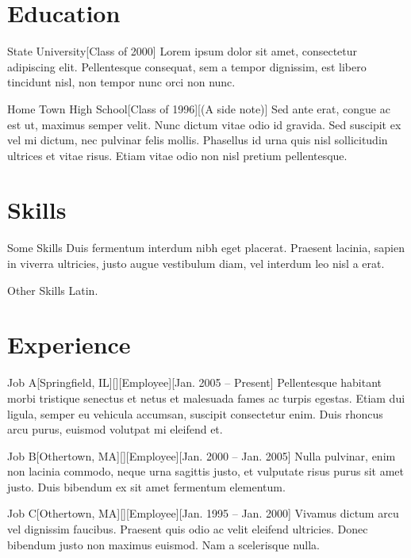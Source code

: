 \documentclass{kres}
\author{John Q. Public}
\begin{document}
\makename
\makecontact
\section{Education}
\begin{entry}{State University}[Class of 2000]
Lorem ipsum dolor sit amet, consectetur adipiscing elit. Pellentesque consequat, sem a tempor dignissim, est libero tincidunt nisl, non tempor nunc orci non nunc.
\end{entry}
\begin{entry}{Home Town High School}[Class of 1996][(A side note)]
Sed ante erat, congue ac est ut, maximus semper velit. Nunc dictum vitae odio id gravida. Sed suscipit ex vel mi dictum, nec pulvinar felis mollis. Phasellus id urna quis nisl sollicitudin ultrices et vitae risus. Etiam vitae odio non nisl pretium pellentesque.
\end{entry}
\section{Skills}
\begin{inlineentry}{Some Skills}
Duis fermentum interdum nibh eget placerat. Praesent lacinia, sapien in viverra ultricies, justo augue vestibulum diam, vel interdum leo nisl a erat.
\end{inlineentry}
\begin{inlineentry}{Other Skills}
Latin.
\end{inlineentry}
\section{Experience}
\begin{entry}{Job A}[Springfield, IL][][Employee][Jan. 2005 -- Present]
Pellentesque habitant morbi tristique senectus et netus et malesuada fames ac turpis egestas. Etiam dui ligula, semper eu vehicula accumsan, suscipit consectetur enim. Duis rhoncus arcu purus, euismod volutpat mi eleifend et.
\end{entry}
\begin{entry}{Job B}[Othertown, MA][][Employee][Jan. 2000 -- Jan. 2005]
Nulla pulvinar, enim non lacinia commodo, neque urna sagittis justo, et vulputate risus purus sit amet justo. Duis bibendum ex sit amet fermentum elementum.
\end{entry}
\begin{entry}{Job C}[Othertown, MA][][Employee][Jan. 1995 -- Jan. 2000]
Vivamus dictum arcu vel dignissim faucibus. Praesent quis odio ac velit eleifend ultricies. Donec bibendum justo non maximus euismod. Nam a scelerisque nulla.
\end{entry}
\end{document}
